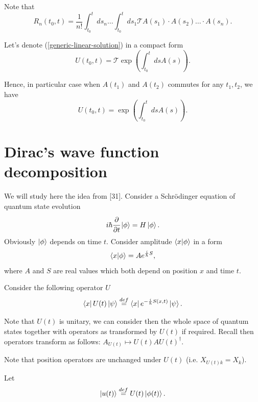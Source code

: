 \documentclass[main.tex]{subfiles}
\begin{document}
Note that
\begin{equation}
R_n(t_0, t) = \frac{1}{n!} \int_{t_0}^t ds_n \dots\int_{t_0}^t ds_1 \mathcal{T} A(s_1)\cdot A(s_2) \dots \cdot A(s_n).
\end{equation}

Let's denote (\ref{generic-linear-solution}) in a compact form
\begin{equation}
\label{generic-linear-solution2}
U(t_0, t) = \mathcal{T} \exp(\int_{t_0}^t ds A(s)).
\end{equation}

Hence, in particular case when $A(t_1)$ and $A(t_2)$ commutes for any $t_1, t_2$, we have
\begin{equation}
U(t_0, t) = \exp(\int_{t_0}^t ds A(s)).
\end{equation}

\section{Dirac's wave function decomposition}
We will study here the idea from  \cite{dirac1981}[31].
Consider a Schrödinger equation of quantum state evolution
\begin{equation}
i\hbar\cfrac{\partial}{\partial t} \ket{\phi} = H\ket{\phi}.
\end{equation}
Obviously $\ket{\phi}$ depends on time $t$. Consider amplitude $\bra{x}\ket{\phi}$ in a form 
\begin{equation}
\bra{x}\ket{\phi} = A e^{\frac{i}{\hbar}S},
\end{equation}
where $A$ and $S$ are real values which both depend on position $x$ and time $t$.

Consider the following operator $U$
\begin{equation}
\bra{x}U(t)\ket{\psi} \stackrel{def}{=} \bra{x} e^{-\frac{i}{\hbar}S(x,t)} \ket{\psi}.
\end{equation}

Note that $U(t)$ is unitary, we can consider then the whole space of quantum states together with operators as transformed by $U(t)$ if required. Recall then operators transform as follows: $A_{U(t)}\mapsto U(t) A U(t)^\dagger$.

Note that position operators are unchanged under $U(t)$ (i.e. $X_{U(t)k} = X_k$).

Let 
\begin{equation}
\ket{u(t)}  \stackrel{def}{=} U(t)\ket{\phi(t)}.
\end{equation}
\end{document}
